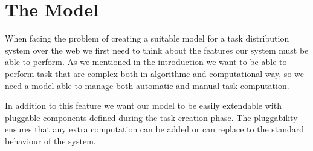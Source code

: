 \chapter{The Model}
\label{cap:model}







When facing the problem of creating a suitable model for a task distribution system over the web
we first need to think about the features our system must be able to perform.
As we mentioned in the \hyperref[intro]{introduction} we want to be able to perform task that are complex both in
algorithmc and computational way, so we need a model able to manage both automatic and
manual task computation.

In addition to this feature we want our model to be easily extendable with pluggable components
defined during the task creation phase. The pluggability ensures that any extra computation can be 
added or can replace to the standard behaviour of the system.\\



